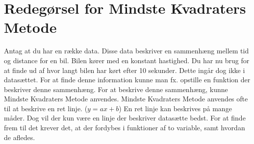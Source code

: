 \section{Redegørsel for Mindste Kvadraters Metode}\label{sec:redegorsel}
Antag at du har en række data. Disse data beskriver en sammenhæng mellem tid og distance for en bil. Bilen kører med en konstant hastighed. Du har nu brug for at finde ud af hvor langt bilen har kørt efter 10 sekunder. Dette ingår dog ikke i datasættet. For at finde denne information kunne man fx. opstille en funktion der beskriver denne sammenhæng. For at beskrive denne sammenhæng, kunne Mindste Kvadraters Metode anvendes. Mindste Kvadraters Metode anvendes ofte til at beskrive en ret linje. (\begin{math}y = ax + b\end{math}) En ret linje kan beskrives på mange måder. Dog vil der kun være en linje der beskriver datasætte bedst. For at finde frem til det krever det, at der fordybes i funktioner af to variable, samt hvordan de afledes.



